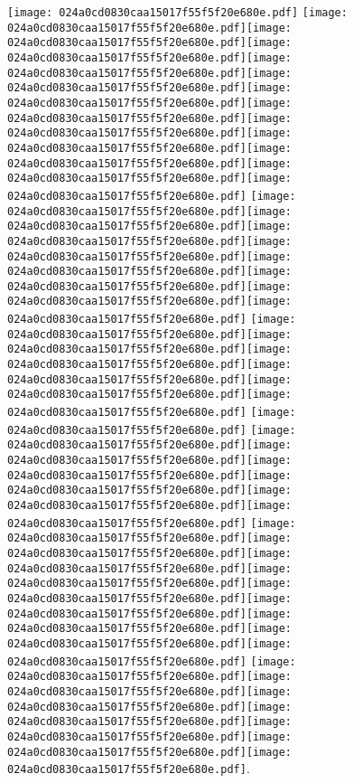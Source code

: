 \documentclass{article}
\newcommand{\origpg}[2]{\texttt{[image: 024a0cd0830caa15017f55f5f20e680e.pdf]}}
\begin{document}
{\vspace{19.754pt}\hspace{36.161pt} 

\vspace{1.831pt}\hspace{18.094pt}\origpg6{103.4pt 247.23pt 110.82pt 263.37pt} \origpg6{121.46pt 247.23pt 132.23pt 263.37pt}\origpg6{132.29pt 247.23pt 140.93pt 263.37pt}\origpg6{140.93pt 247.23pt 147.3pt 263.37pt}\hspace{-0.323pt}\origpg6{146.98pt 247.23pt 155.05pt 263.37pt}\hspace{-0.597pt}\origpg6{154.45pt 247.23pt 161.62pt 263.37pt}\hspace{0.291pt}\origpg6{161.91pt 247.23pt 169.97pt 263.37pt}\origpg6{169.87pt 247.23pt 178.5pt 263.37pt}\origpg6{178.5pt 247.23pt 184.88pt 263.37pt}\origpg6{184.8pt 247.23pt 191.96pt 263.37pt}\origpg6{192.01pt 247.23pt 200.65pt 263.37pt}\origpg6{200.65pt 247.23pt 209.28pt 263.37pt}\origpg6{209.35pt 247.23pt 216.77pt 263.37pt} \origpg6{220.76pt 247.23pt 228.98pt 263.37pt}\origpg6{228.98pt 247.23pt 236.6pt 263.37pt}\hspace{-0.178pt}\origpg6{236.42pt 247.23pt 245.06pt 263.37pt}\origpg6{245.06pt 247.23pt 256.21pt 263.37pt}\hspace{-0.273pt}\origpg6{255.94pt 247.23pt 263.1pt 263.37pt}\hspace{-0.178pt}\origpg6{262.92pt 247.23pt 271.56pt 263.37pt}\origpg6{271.56pt 247.23pt 280.2pt 263.37pt}\origpg6{98.5mm 247.23pt 287.68pt 263.37pt} \origpg6{291.61pt 247.23pt 299.73pt 263.37pt}\origpg6{299.78pt 247.23pt 306.94pt 263.37pt}\hspace{-0.178pt}\origpg6{306.77pt 247.23pt 313.93pt 263.37pt}\origpg6{313.98pt 247.23pt 321.03pt 263.37pt}\origpg6{320.97pt 247.23pt 329.6pt 263.37pt}\origpg6{329.6pt 247.23pt 338.24pt 263.37pt} \origpg6{342.16pt 247.23pt 349.78pt 263.37pt} \origpg6{353.72pt 247.23pt 361.79pt 263.37pt}\hspace{-0.113pt}\origpg6{361.67pt 247.23pt 368.84pt 263.37pt}\hspace{-0.178pt}\origpg6{368.66pt 247.23pt 379.82pt 263.37pt}\origpg6{379.75pt 247.23pt 388.39pt 263.37pt}\origpg6{388.39pt 247.23pt 398.6pt 263.37pt}\origpg6{398.54pt 247.23pt 405.71pt 263.37pt} \origpg6{409.61pt 247.23pt 417.68pt 263.37pt}\origpg6{417.78pt 247.23pt 424.94pt 263.37pt}\origpg6{424.99pt 247.23pt 432.16pt 263.37pt}\hspace{0.29pt}\origpg6{432.45pt 247.23pt 440.5pt 263.37pt}\origpg6{440.41pt 247.23pt 447.77pt 263.37pt}\origpg6{447.86pt 247.23pt 456.5pt 263.37pt}\origpg6{456.5pt 247.23pt 464.57pt 263.37pt}\origpg6{464.49pt 247.23pt 471.11pt 263.37pt}\hspace{-0.597pt}\origpg6{470.51pt 247.23pt 478.58pt 263.37pt} \origpg6{482.55pt 247.23pt 490.17pt 263.37pt}\origpg6{490.25pt 247.23pt 498.32pt 263.37pt}\origpg6{498.42pt 247.23pt 505.58pt 263.37pt}\hspace{-0.178pt}\origpg6{505.4pt 247.23pt 515.62pt 263.37pt}\origpg6{515.52pt 247.23pt 522.69pt 263.37pt}\hspace{-0.178pt}\origpg6{522.51pt 247.23pt 531.15pt 263.37pt}\origpg6{531.15pt 247.23pt 539.78pt 263.37pt}. 

}
\end{document}
